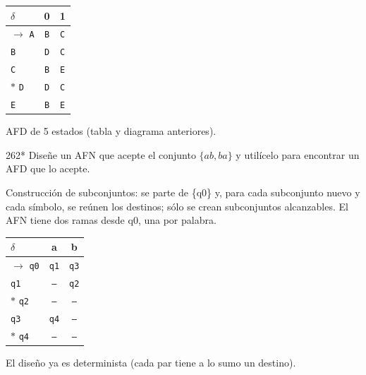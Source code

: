 \documentclass[11pt]{article}
\begin{document}
\begin{center}\small\begin{tabular}{lcc}\toprule
$\delta$ & 0 & 1 \\\midrule
$\to$ \texttt{A} & \texttt{B} & \texttt{C} \\
 \texttt{B} & \texttt{D} & \texttt{C} \\
 \texttt{C} & \texttt{B} & \texttt{E} \\
$*$ \texttt{D} & \texttt{D} & \texttt{C} \\
 \texttt{E} & \texttt{B} & \texttt{E} \\
\bottomrule\end{tabular}\end{center}

\resp AFD de 5 estados (tabla y diagrama anteriores).


\begin{ejercicio}{262}{*}
Diseñe un AFN que acepte el conjunto $\{ab, ba\}$ y utilícelo para encontrar un AFD que lo acepte.
\end{ejercicio}
\proc Construcción de subconjuntos: se parte de \{q0\} y, para cada subconjunto nuevo y cada símbolo, se reúnen los destinos; sólo se crean subconjuntos alcanzables. El AFN tiene dos ramas desde q0, una por palabra.
\begin{center}\small\begin{tabular}{lcc}\toprule
$\delta$ & a & b \\\midrule
$\to$ \texttt{q0} & \texttt{q1} & \texttt{q3} \\
 \texttt{q1} & \texttt{--} & \texttt{q2} \\
$*$ \texttt{q2} & \texttt{--} & \texttt{--} \\
 \texttt{q3} & \texttt{q4} & \texttt{--} \\
$*$ \texttt{q4} & \texttt{--} & \texttt{--} \\
\bottomrule\end{tabular}\end{center}
El diseño ya es determinista (cada par tiene a lo sumo un destino).
\end{document}
